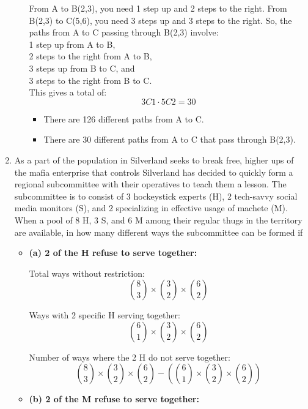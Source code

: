 \documentclass{book}
\begin{document}
\begin{enumerate}
\begin{itemize}
		            From A to B(2,3), you need 1 step up and 2 steps to the right.
		            From B(2,3) to C(5,6), you need 3 steps up and 3 steps to the right.
		            So, the paths from A to C passing through B(2,3) involve:\\

		            1 step up from A to B,\\
		            2 steps to the right from A to B,\\
		            3 steps up from B to C, and\\
		            3 steps to the right from B to C.\\
		            This gives a total of:
		            \[
			            3C1 \cdot 5C2 = 30
		            \]
		            \begin{itemize}
			            \item  There are 126 different paths from A to C.
			            \item There are 30 different paths from A to C that pass through B(2,3).
		            \end{itemize}
	      \end{itemize}
	\item As a part of the population in Silverland seeks to break free,
	      higher ups of the mafia enterprise that controls Silverland has
	      decided to quickly form a regional subcommittee with their
	      operatives to teach them a lesson. The subcommittee is to
	      consist of 3 hockeystick experts (H), 2 tech-savvy social media
	      monitors (S), and 2 specializing in effective usage of machete
	      (M). When a pool of 8 H, 3 S, and 6 M among their regular
	      thugs in the territory are available, in how many different
	      ways the subcommittee can be formed if
	      \begin{itemize}
		      \item \textbf{(a) 2 of the H refuse to serve together:}

		            Total ways without restriction:
		            \[ \binom{8}{3} \times \binom{3}{2} \times \binom{6}{2} \]

		            Ways with 2 specific H serving together:
		            \[ \binom{6}{1} \times \binom{3}{2} \times \binom{6}{2} \]

		            Number of ways where the 2 H do not serve together:
		            \[
			            \binom{8}{3} \times \binom{3}{2} \times \binom{6}{2} - \left( \binom{6}{1} \times \binom{3}{2} \times \binom{6}{2} \right)
		            \]
		      \item \textbf{(b) 2 of the M refuse to serve together:}


\end{itemize}
\end{enumerate}
\end{document}
